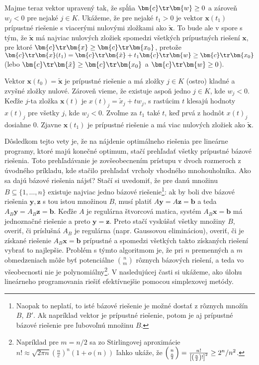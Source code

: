 \begin{dokaz}
\noindent
Majme teraz vektor  upravený tak, že spĺňa  $\bm{c}\tr\bm{w}\ge0$ a
zároveň $w_j<0$ pre nejaké $j\in K$.  Ukážeme, že pre nejaké $t_1>0$ je vektor
$\bm{x}(t_1)$ prípustné riešenie s viacerými nulovými zložkami ako
$\bm{\tilde{x}}$.  To bude ale v spore s tým, že  $\bm{\tilde{x}}$ má najviac
nulových zložiek spomedzi všetkých prípustných riešení $\bm{x}$, pre ktoré
$\bm{c}\tr\bm{x}\ge\bm{c}\tr\bm{x_0}$, pretože
$\bm{c}\tr\bm{x}(t_1)=\bm{c}\tr\bm{\tilde{x}}+t_1\bm{c}\tr\bm{w}\ge\bm{c}\tr\bm{x_0}$
(lebo $\bm{c}\tr\bm{\tilde{x}}\ge\bm{c}\tr\bm{x_0}$ a $\bm{c}\tr\bm{w}\ge0$).

Vektor $\bm{x}(t_0)=\bm{\tilde{x}}$ je prípustné riešenie a má zložky $j\in K$ (ostro) kladné
a zvyšné zložky nulové. Zároveň vieme, že existuje aspoň jedno $j\in K$, kde $w_j<0$.
Keďže $j$-ta zložka $\bm{x}(t)$ je $x(t)_j=\tilde{x}_j+tw_j$, s rastúcim $t$ klesajú hodnoty $x(t)_j$
pre všetky $j$, kde $w_j<0$. Zvoľme za $t_1$ také $t$, keď prvá z hodnôt $x(t)_j$ dosiahne 0.
Zjavne $\bm{x}(t_1)$ je prípustné riešenie a má viac nulových zložiek ako $\bm{\tilde{x}}$.
\end{dokaz}

\noindent Dôsledkom tejto vety je, že na nájdenie optimálneho riešenia pre
lineárne programy, ktoré majú konečné optimum, stačí prehľadať všetky prípustné
bázové riešenia.  Toto prehľadávanie je zovšeobecnením prístupu v dvoch
rozmeroch z úvodného príkladu, kde stačilo prehľadať vrcholy vhodného
mnohouholníka.  Ako sa dajú bázové riešenia nájsť? Stačí si uvedomiť, že pre
danú množinu $B\subseteq\{1,\ldots,n\}$ existuje najviac jedno bázové
riešenie\footnote{Naopak to neplatí, to isté bázové riešenie  je možné
  dostať z rôznych množín $B$, $B'$. Ak napríklad vektor  je prípustné
riešenie, potom je aj prípustné bázové riešenie pre ľubovoľnú množinu $B$.}:
ak by boli dve bázové riešenia $\bm{y},\bm{z}$ s tou istou množinou $B$, musí
platiť $A\bm{y}=A\bm{z}=\bm{b}$ a teda $A_B\bm{y}=A_B\bm{z}=\bm{b}$. Keďže $A$
je regulárna štvorcová matica, systém $A_B\bm{x}=\bm{b}$ má jednoznačné riešenie
a preto $\bm{y}=\bm{z}$.
Preto stačí vyskúšať všetky množiny $B$, overiť, či príslušná $A_B$ je regulárna (napr. Gaussovou elimináciou),
overiť, či je získané riešenie $A_B\bm{x}=\bm{b}$ prípustné a spomedzi všetkých takto získaných riešení
 vybrať to najlepšie.
Problém s týmto algoritmom je, že pri $n$ premenných a $m$
obmedzeniach môže byť potenciálne ${n\choose m}$ rôznych bázových riešení, a
teda vo všeobecnosti nie je polynomiálny\footnote{%
  Napríklad pre $m=n/2$ sa zo Stirlingovej aproximácie $n!\approx\sqrt{2\pi n}\left(\frac{n}{e}\right)^n\left(1+o(n)\right)$ ľahko
ukáže, že \hbox{$\left(n\atop \frac{n}{2}\right)=\frac{n!}{\left[\left(\frac{n}{2}\right)!\right]^2}\ge 2^n/n^2$.}}.
V nasledujúcej časti si ukážeme, ako úlohu lineárneho programovania riešiť efektívnejšie
pomocou simplexovej metódy.


